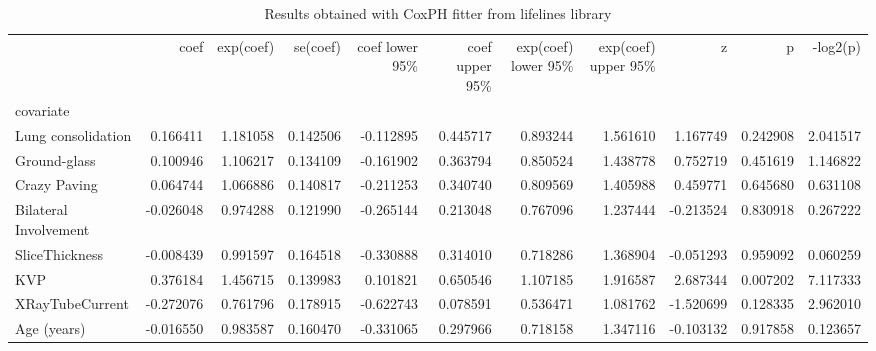 \begin{table}
\centering
\caption{Results obtained with CoxPH fitter from lifelines library\label{tab:CoxResult}}
\begin{adjustbox}{width=0.7\paperheight, angle=90}
\begin{tabular}{|lrrrrrrrrrr|}
\toprule
{} &      coef &  exp(coef) &  se(coef) &  coef lower 95\% &  coef upper 95\% &  exp(coef) lower 95\% &  exp(coef) upper 95\% &         z &         p &  -log2(p) \\
covariate                               &           &            &           &                 &                 &                      &                      &           &           &           \\
\midrule
Lung consolidation                      &  0.166411 &   1.181058 &  0.142506 &       -0.112895 &        0.445717 &             0.893244 &             1.561610 &  1.167749 &  0.242908 &  2.041517 \\
Ground-glass                            &  0.100946 &   1.106217 &  0.134109 &       -0.161902 &        0.363794 &             0.850524 &             1.438778 &  0.752719 &  0.451619 &  1.146822 \\
Crazy Paving                            &  0.064744 &   1.066886 &  0.140817 &       -0.211253 &        0.340740 &             0.809569 &             1.405988 &  0.459771 &  0.645680 &  0.631108 \\
Bilateral Involvement                   & -0.026048 &   0.974288 &  0.121990 &       -0.265144 &        0.213048 &             0.767096 &             1.237444 & -0.213524 &  0.830918 &  0.267222 \\
SliceThickness                          & -0.008439 &   0.991597 &  0.164518 &       -0.330888 &        0.314010 &             0.718286 &             1.368904 & -0.051293 &  0.959092 &  0.060259 \\
KVP                                     &  0.376184 &   1.456715 &  0.139983 &        0.101821 &        0.650546 &             1.107185 &             1.916587 &  2.687344 &  0.007202 &  7.117333 \\
XRayTubeCurrent                         & -0.272076 &   0.761796 &  0.178915 &       -0.622743 &        0.078591 &             0.536471 &             1.081762 & -1.520699 &  0.128335 &  2.962010 \\
Age (years)                             & -0.016550 &   0.983587 &  0.160470 &       -0.331065 &        0.297966 &             0.718158 &             1.347116 & -0.103132 &  0.917858 &  0.123657 \\

\end{tabular}
\end{adjustbox}
\end{table}

